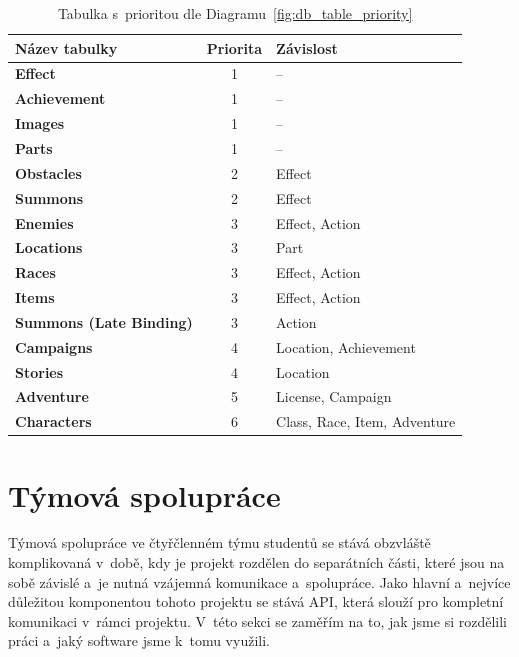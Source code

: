 \begin{table}[H]
    \centering
        \begin{tabular}{l c l}
            \toprule

            \textbf{Název tabulky} & \textbf{Priorita} & \textbf{Závislost} \\
            \midrule

            \textbf{Effect} & 1 & -- \\
            \textbf{Achievement} & 1 & -- \\
            \textbf{Images} & 1 & -- \\
            \textbf{Parts} & 1 & -- \\
            \textbf{Obstacles} & 2 & Effect \\
            \textbf{Summons} & 2 & Effect \\
            \textbf{Enemies} & 3 & Effect, Action \\
            \textbf{Locations} & 3 & Part \\
            \textbf{Races} & 3 & Effect, Action \\
            \textbf{Items} & 3 & Effect, Action \\
            \textbf{Summons (Late Binding)} & 3 & Action \\
            \textbf{Campaigns} & 4 & Location, Achievement \\
            \textbf{Stories} & 4 & Location \\
            \textbf{Adventure} & 5 & License, Campaign \\
            \textbf{Characters} & 6 & Class, Race, Item, Adventure \\

            \bottomrule
        \end{tabular}
    \caption{Tabulka s~prioritou dle Diagramu~\ref{fig:db_table_priority}
    \label{tab:db_table_priority}}
\end{table}

\section{Týmová spolupráce}
\label{sec:implementation-collaboration}
Týmová spolupráce ve čtyřčlenném týmu studentů se stává obzvláště komplikovaná v~době, kdy je projekt rozdělen do separátních části, které jsou na sobě závislé a~je nutná vzájemná komunikace a~spolupráce. Jako hlavní a~nejvíce důležitou komponentou tohoto projektu se stává API, která slouží pro kompletní komunikaci v~rámci projektu. V~této sekci se zaměřím na to, jak jsme si rozdělili práci a~jaký software jsme k~tomu využili.

